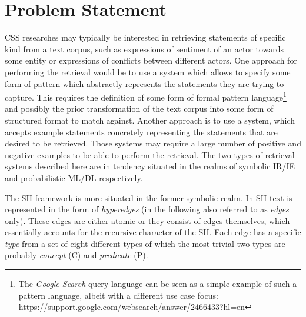 \documentclass[11pt]{scrreprt}
\begin{document}
%
%




\section{Problem Statement}
CSS researches may typically be interested in retrieving statements of specific kind from a text corpus, such as expressions of sentiment of an actor towards some entity or expressions of conflicts between different actors. One approach for performing the retrieval would be to use a system which allows to specify some form of pattern which abstractly represents the statements they are trying to capture. This requires the definition of some form of formal pattern language\footnote{The \textit{Google Search} query language can be seen as a simple example of such a pattern language, albeit with a different use case focus: \url{https://support.google.com/websearch/answer/2466433?hl=en}} and possibly the prior transformation of the text corpus into some form of structured format to match against. Another approach is to use a system, which accepts example statements concretely representing the statements that are desired to be retrieved. Those systems may require a large number of positive and negative examples to be able to perform the retrieval. The two types of retrieval systems described here are in tendency situated in the realms of symbolic IR/IE and probabilistic ML/DL respectively.

The SH framework is more situated in the former symbolic realm. In SH text is represented in the form of \textit{hyperedges} (in the following also referred to as \textit{edges} only). These edges are either atomic or they consist of edges themselves, which essentially accounts for the recursive character of the SH. Each edge has a specific \textit{type} from a set of eight different types of which the most trivial two types are probably \textit{concept} (\textsf{C}) and \textit{predicate} (\textsf{P}). 
\end{document}
